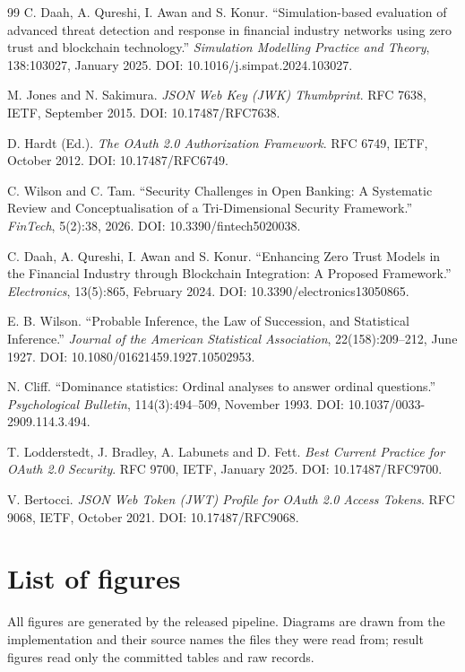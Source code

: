 \begin{thebibliography}{99}
 C. Daah, A. Qureshi, I. Awan and S. Konur. ``Simulation-based evaluation of advanced threat detection and response in financial industry networks using zero trust and blockchain technology.'' \textit{Simulation Modelling Practice and Theory}, 138:103027, January 2025. DOI: 10.1016/j.simpat.2024.103027.

 M. Jones and N. Sakimura. \textit{JSON Web Key (JWK) Thumbprint}. RFC 7638, IETF, September 2015. DOI: 10.17487/RFC7638.

 D. Hardt (Ed.). \textit{The OAuth 2.0 Authorization Framework}. RFC 6749, IETF, October 2012. DOI: 10.17487/RFC6749.

 C. Wilson and C. Tam. ``Security Challenges in Open Banking: A Systematic Review and Conceptualisation of a Tri-Dimensional Security Framework.'' \textit{FinTech}, 5(2):38, 2026. DOI: 10.3390/fintech5020038.

 C. Daah, A. Qureshi, I. Awan and S. Konur. ``Enhancing Zero Trust Models in the Financial Industry through Blockchain Integration: A Proposed Framework.'' \textit{Electronics}, 13(5):865, February 2024. DOI: 10.3390/electronics13050865.

 E. B. Wilson. ``Probable Inference, the Law of Succession, and Statistical Inference.'' \textit{Journal of the American Statistical Association}, 22(158):209--212, June 1927. DOI: 10.1080/01621459.1927.10502953.

 N. Cliff. ``Dominance statistics: Ordinal analyses to answer ordinal questions.'' \textit{Psychological Bulletin}, 114(3):494--509, November 1993. DOI: 10.1037/0033-2909.114.3.494.

 T. Lodderstedt, J. Bradley, A. Labunets and D. Fett. \textit{Best Current Practice for OAuth 2.0 Security}. RFC 9700, IETF, January 2025. DOI: 10.17487/RFC9700.

 V. Bertocci. \textit{JSON Web Token (JWT) Profile for OAuth 2.0 Access Tokens}. RFC 9068, IETF, October 2021. DOI: 10.17487/RFC9068.

\end{thebibliography}

\section*{List of figures}

All figures are generated by the released pipeline. Diagrams are drawn from the implementation and their source names the files they were read from; result figures read only the committed tables and raw records.

